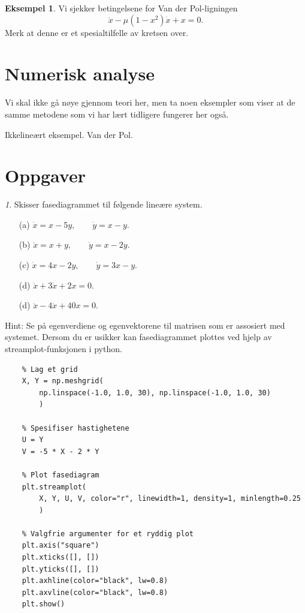 \documentclass{article}
\theoremstyle{plain}
\theoremstyle{definition}
\newtheorem{eksempel}[teorem]{Eksempel}
\theoremstyle{remark}
\newtheorem{oppg}{}
\begin{document}
\begin{eksempel}
    Vi sjekker betingelsene for Van der Pol-ligningen
    \begin{equation*}
        \ddot{x} - \mu (1 - x^2) \dot{x} + x = 0.
    \end{equation*}
    Merk at denne er et spesialtilfelle av kretsen over.
\end{eksempel}

\section*{Numerisk analyse}

Vi skal ikke gå nøye gjennom teori her, men ta noen eksempler som viser at de samme metodene som vi har lært tidligere fungerer her også.

Ikkelineært eksempel. Van der Pol.


\section*{Oppgaver}

\begin{oppg}
    Skisser fasediagrammet til følgende lineære system.
    \begin{itemize}
        \item[(a)] $\dot{x} = x - 5y, \qquad \dot{y} = x - y$.
        \item[(b)] $\dot{x} = x + y, \qquad \dot{y} = x - 2y$.
        \item[(c)] $\dot{x} = 4x - 2y, \qquad \dot{y} = 3x - y$.
        \item[(d)] $\ddot{x} + 3\dot{x} + 2x = 0$.
        \item[(d)] $\ddot{x} - 4\dot{x} + 40x = 0$.
    \end{itemize}
    Hint: Se på egenverdiene og egenvektorene til matrisen som er assosiert med systemet. Dersom du er usikker kan fasediagrammet plottes ved hjelp av streamplot-funksjonen i python.
    \begin{lstlisting}
    % Lag et grid
    X, Y = np.meshgrid(
        np.linspace(-1.0, 1.0, 30), np.linspace(-1.0, 1.0, 30)
        )
    
    % Spesifiser hastighetene
    U = Y
    V = -5 * X - 2 * Y

    % Plot fasediagram
    plt.streamplot(
        X, Y, U, V, color="r", linewidth=1, density=1, minlength=0.25
        )
    
    % Valgfrie argumenter for et ryddig plot
    plt.axis("square")
    plt.xticks([], [])
    plt.yticks([], [])
    plt.axhline(color="black", lw=0.8)
    plt.axvline(color="black", lw=0.8)
    plt.show()

    \end{lstlisting}
\end{oppg}
\end{document}
